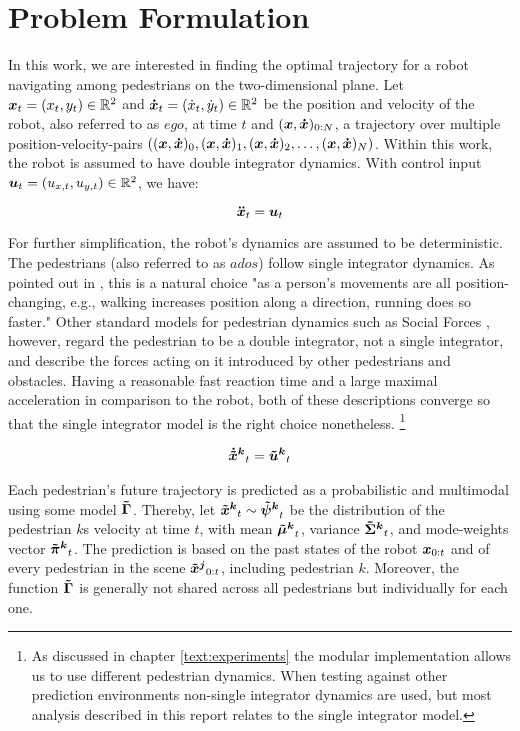 
\section{Problem Formulation}
\label{text:approach/formulation}
In this work, we are interested in finding the optimal trajectory for a robot navigating among pedestrians on the two-dimensional plane. Let $\boldsymbol{x}_t = (x_t, y_t) \in \mathbb{R}^2$ and $\boldsymbol{\dot{x}}_t = (\dot{x}_t, \dot{y}_t) \in \mathbb{R}^2 $ be the position and velocity of the robot, also referred to as $ego$, at time $t$ and $(\boldsymbol{x}, \boldsymbol{\dot{x}})_{0:N}$, a trajectory over multiple position-velocity-pairs $((\boldsymbol{x}, \boldsymbol{\dot{x}})_0, (\boldsymbol{x}, \boldsymbol{\dot{x}})_1, (\boldsymbol{x}, \boldsymbol{\dot{x}})_2, \hdots, (\boldsymbol{x}, \boldsymbol{\dot{x}})_N)$. Within this work, the robot is assumed to have double integrator dynamics. With control input $\boldsymbol{u}_t = (u_{x, t}, u_{y, t}) \in \mathbb{R}^2$, we have: 

\begin{equation}
\boldsymbol{\ddot{x}}_t = \boldsymbol{u}_t
\label{eq:robot_dynamics}
\end{equation}

For further simplification, the robot's dynamics are assumed to be deterministic. 
The pedestrians (also referred to as $ados$) follow single integrator dynamics. As pointed out in \cite{Ivanovic18}, this is a natural choice "as a person's movements are all position-changing, e.g., walking increases position along a direction, running does so faster." Other standard models for pedestrian dynamics such as Social Forces \cite{Helbling1995}, however, regard the pedestrian to be a double integrator, not a single integrator, and describe the forces acting on it introduced by other pedestrians and obstacles. Having a reasonable fast reaction time and a large maximal acceleration in comparison to the robot, both of these descriptions converge so that the single integrator model is the right choice nonetheless. \footnote{As discussed in chapter \ref{text:experiments} the modular implementation allows us to use different pedestrian dynamics. When testing against other prediction environments non-single integrator dynamics are used, but most analysis described in this report relates to the single integrator model.}

\begin{align}
\dxped[k]_t = \uped[k]_t
\label{eq:pedestrian_dynamics}
\end{align}

Each pedestrian's future trajectory is predicted as a probabilistic and multimodal using some model $\distmodel[]$. Thereby, let $\xped[k]_t \sim \dist[k]_t$ be the distribution of the pedestrian $k$s velocity at time $t$, with mean $\muped[k]_t$, variance $\sigmaped[k]_t$, and mode-weights vector $\piped[k]_t$. The prediction is based on the past states of the robot $\boldsymbol{x}_{0:t}$ and of every pedestrian in the scene $\xped[j]_{0:t}$, including pedestrian $k$. Moreover, the function $\distmodel[]$ is generally not shared across all pedestrians but individually for each one.

